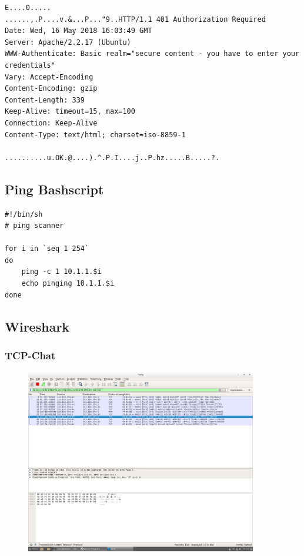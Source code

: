 \documentclass[12pt]{article}
\theoremstyle{plain}
\begin{document}
\begin{lstlisting}
E....0.....	
......,.P....v.&...P..."9..HTTP/1.1 401 Authorization Required
Date: Wed, 16 May 2018 16:03:49 GMT
Server: Apache/2.2.17 (Ubuntu)
WWW-Authenticate: Basic realm="secure content - you have to enter your credentials"
Vary: Accept-Encoding
Content-Encoding: gzip
Content-Length: 339
Keep-Alive: timeout=15, max=100
Connection: Keep-Alive
Content-Type: text/html; charset=iso-8859-1

..........u.OK.@....).^.P.I....j..P.hz.....B.....?.
\end{lstlisting}
\subsection*{Ping Bashscript}
\begin{lstlisting}
#!/bin/sh
# ping scanner

for i in `seq 1 254`
do
	ping -c 1 10.1.1.$i
	echo pinging 10.1.1.$i
done
\end{lstlisting}
\subsection*{Wireshark}
\subsubsection*{TCP-Chat}
\begin{figure}[!ht]
	\centering
     \includegraphics[width=0.9\textwidth]{Bilder/tcp-chat_1.png}
\end{figure}
\newpage
\end{document}
